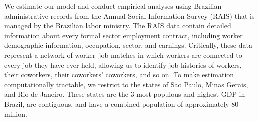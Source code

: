 \documentclass[12pt]{article}
\theoremstyle{definition}
\theoremstyle{plain}
\begin{document}
We estimate our model and conduct empirical analyses using Brazilian administrative records from the Annual Social Information Survey (RAIS) that is managed by the Brazilian labor ministry. The RAIS data contain detailed information about every formal sector employment contract, including worker demographic information, occupation, sector, and earnings. Critically, these data represent a network of worker--job matches in which workers are connected to every job they have ever held, allowing us to identify job histories of workers, their coworkers, their coworkers' coworkers, and so on. To make estimation computationally tractable, we restrict to the states of Sao Paulo, Minas Gerais, and Rio de Janeiro. These states are the 3 most populous and highest GDP in Brazil, are contiguous, and have a combined population of approximately 80 million.


\end{document}
